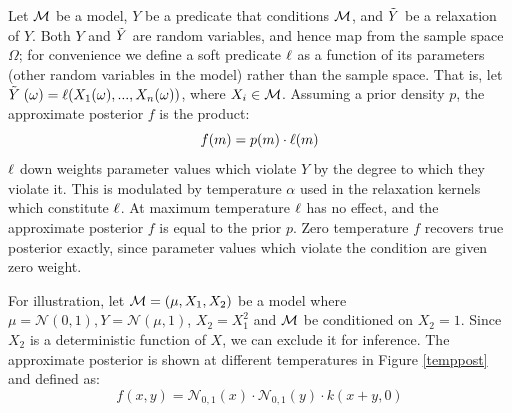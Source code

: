 Let ${\mathcal{M}}$ be a model, $Y$ be a predicate that conditions ${\mathcal{M}}$, and $\mathrel{\tilde{Y}}$ be a relaxation of $Y$.
Both $Y$ and $\mathrel{\tilde{Y}}$ are random variables, and hence map from the sample space $\Omega$;
for convenience we define a soft predicate $\operatorname{\ell}$ as a function of its parameters (other random variables in the model) rather than the sample space.
That is, let $\mathrel{\tilde{Y}}(\omega) = \operatorname{\ell}(X_1(\omega), ..., X_n(\omega))$, where $X_i \in {\mathcal{M}}$.
Assuming a prior density $p$, the approximate posterior $f$ is the product:
\begin{equation}
f(m) = p(m) \cdot \operatorname{\ell}(m)
\end{equation}
$\operatorname{\ell}$ down weights parameter values which violate $Y$ by the degree to which they violate it. 
This is modulated by temperature $\alpha$ used in the relaxation kernels which constitute $\operatorname{\ell}$.
At maximum temperature $\operatorname{\ell}$ has no effect, and the approximate posterior $f$ is equal to the prior $p$.
Zero temperature $f$ recovers true posterior exactly, since parameter values which violate the condition are given zero weight.

For illustration, let ${\mathcal{M}} = (\mu, X_1, X_2)$ be a model where $\mu = \mathcal{N}(0, 1), Y = \mathcal{N}(\mu, 1)$, $X_2 = X_1^2$ and ${\mathcal{M}}$ be conditioned on $X_2 = 1$.
Since $X_2$ is a deterministic function of $X$, we can exclude it for inference.
The approximate posterior is shown at different temperatures in Figure \ref{temppost} and defined as:
\begin{equation}\label{approxposterior}
f(x, y) = \mathcal{N}_{0,1}(x) \cdot \mathcal{N}_{0,1}(y) \cdot k(x + y, 0) 
\end{equation}

